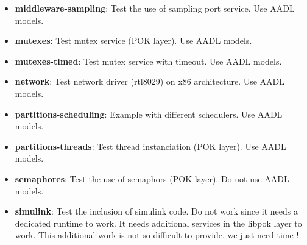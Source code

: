 \begin{itemize}
   \item
      \textbf{middleware-sampling}:
         Test the use of sampling port service.
         Use AADL models.

   \item
      \textbf{mutexes}:
         Test mutex service (POK layer).
         Use AADL models.

   \item
      \textbf{mutexes-timed}:
         Test mutex service with timeout. Use AADL models.
         
   \item
      \textbf{network}:
         Test network driver (rtl8029) on x86 architecture.
         Use AADL models.

   \item
      \textbf{partitions-scheduling}:
         Example with different schedulers.
         Use AADL models.

   \item
      \textbf{partitions-threads}:
         Test thread instanciation (POK layer). Use AADL models.

   \item
      \textbf{semaphores}:
         Test the use of semaphors (POK layer). Do not use AADL
         models.

   \item
      \textbf{simulink}: Test the inclusion of simulink code. Do not
         work since it needs a dedicated runtime to work. It needs additional
         services in the libpok layer to work. This additional work is not so
         difficult to provide, we just need time !
\end{itemize}



